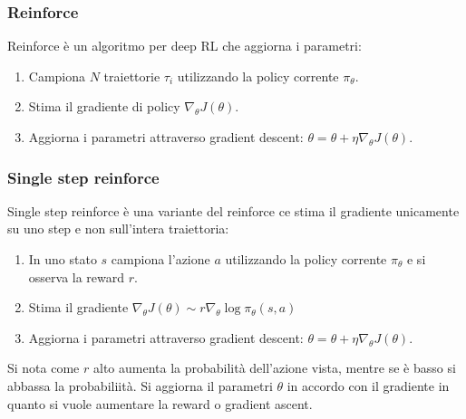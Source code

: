 		\subsubsection{Reinforce}
		Reinforce \`e un algoritmo per deep RL che aggiorna i parametri:
		\begin{enumerate}
			\item Campiona $N$ traiettorie $\tau_i$ utilizzando la policy corrente $\pi_\theta$.
			\item Stima il gradiente di policy $\nabla_\theta J(\theta)$.
			\item Aggiorna i parametri attraverso gradient descent: $\theta = \theta + \eta\nabla_\theta J(\theta)$.
		\end{enumerate}

		\subsubsection{Single step reinforce}
		Single step reinforce \`e una variante del reinforce ce stima il gradiente unicamente su uno step e non sull'intera traiettoria:
		\begin{enumerate}
			\item In uno stato $s$ campiona l'azione $a$ utilizzando la policy corrente $\pi_\theta$ e si osserva la reward $r$.
			\item Stima il gradiente $\nabla_\theta J(\theta)\sim r\nabla_\theta\log\pi_\theta(s,a)$
			\item Aggiorna i parametri attraverso gradient descent: $\theta = \theta + \eta\nabla_\theta J(\theta)$.
		\end{enumerate}
		Si nota come $r$ alto aumenta la probabilit\`a dell'azione vista, mentre se \`e basso si abbassa la probabiliit\`a.
		Si aggiorna il parametri $\theta$ in accordo con il gradiente in quanto si vuole aumentare la reward o gradient ascent.

